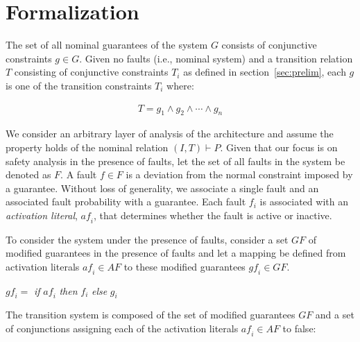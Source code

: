 \section{Formalization}
\label{sec:formalization}
The set of all nominal guarantees of the system $G$ consists of conjunctive constraints $g \in G$. Given no faults (i.e., nominal system) and a transition relation $T$ consisting of conjunctive constraints $T_i$ as defined in section~\ref{sec:prelim}, each $g$ is one of the transition constraints $T_i$ where:

\begin{gather}
T = g_1 \land  g_2 \land \cdots \land g_n
\label{eq:Tn}
\end{gather}

We consider an arbitrary layer of analysis of the architecture and assume the property holds of the nominal relation $(I,T) \vdash P$. Given that our focus is on safety analysis in the presence of faults, let the set of all faults in the system be  denoted as $F$. A fault $f \in F$ is a deviation from the normal constraint imposed by a guarantee. Without loss of generality, we associate a single fault and an associated fault probability with a guarantee. Each fault $f_i$ is associated with an \emph{activation literal}, $\mathit{af}_i$, that determines whether the fault is active or inactive. %


To consider the system under the presence of faults, consider a set $GF$ of modified guarantees in the presence of faults and let a mapping be defined from activation literals $\mathit{af}_i \in AF$ to these modified guarantees $\mathit{gf}_i \in GF$. 
\begin{center}
$\mathit{gf}_i =$ \textit{if} $\mathit{af}_i$ \textit{then} $f_i$ \textit{else} $g_i$\\
\label{eq:sigma}
\end{center}

The transition system is composed of the set of modified guarantees $GF$ and a set of conjunctions assigning each of the activation literals $\mathit{af}_i \in AF$ to false: 

